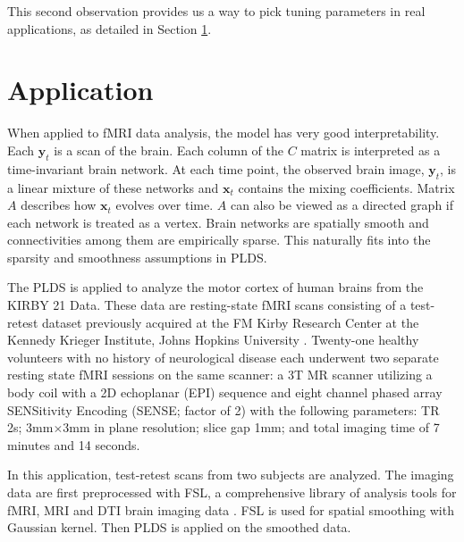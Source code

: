 \documentclass[fleqn]{article}
\let\oldref\ref
\renewcommand{\ref}[1]{(\oldref{#1})}
\begin{document}
This second observation provides us a way to pick tuning parameters in real applications, as detailed in Section \oldref{sec:application}.



\section{Application}
\label{sec:application}
When applied to fMRI data analysis, the model has very good interpretability. Each $\mathbf{y}_t$ is a scan of the brain. Each column of the $C$ matrix is interpreted as a time-invariant brain network. At each time point, the observed brain image, $\mathbf{y}_t$, is a linear mixture of these networks and $\mathbf{x}_t$ contains the mixing coefficients. Matrix $A$ describes how $\mathbf{x}_t$ evolves over time. $A$ can also be viewed as a directed graph if each network is treated as a vertex. Brain networks are spatially smooth and connectivities among them are empirically sparse. This naturally fits into the sparsity and smoothness assumptions in PLDS.

The PLDS is applied to analyze the motor cortex of human brains from the KIRBY 21 Data. These data are resting-state fMRI scans consisting of a test-retest dataset previously acquired at the FM Kirby Research Center at the Kennedy Krieger Institute, Johns Hopkins University \cite{landman2011multi}. Twenty-one healthy volunteers with no history of neurological disease each underwent two separate resting state fMRI sessions on the same scanner: a 3T MR scanner utilizing a body coil with a 2D echoplanar (EPI) sequence and eight channel phased array SENSitivity Encoding (SENSE; factor of 2) with the following parameters: TR 2s; 3mm$\times$3mm in plane resolution; slice gap 1mm; and total imaging time of 7 minutes and 14 seconds.

In this application, test-retest scans from two subjects are analyzed. The imaging data are first preprocessed with FSL, a comprehensive library of analysis tools for fMRI, MRI and DTI brain imaging data \cite{smith2004advances}. FSL is used for spatial smoothing with Gaussian kernel. Then PLDS is applied on the smoothed data.
\end{document}
